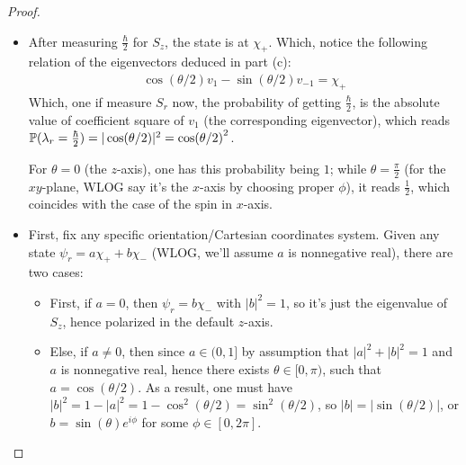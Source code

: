 \documentclass{article}
\begin{document}
\begin{proof}
\begin{itemize}
        Passing through $S_r$, we get the eigenvalues and eigenvectors as follow:
        \begin{align}
            &\lambda=\frac{\hbar}{2}\ \implies\ v_1 = \begin{pmatrix}
                \cos(\theta/2)\\\sin(\theta/2)e^{i\phi}
            \end{pmatrix} = \cos(\theta/2)\chi_+ + \sin(\theta/2)e^{i\phi}\chi_-\\
            &\lambda=\frac{\hbar}{2}\ \implies\ v_{-1} = \begin{pmatrix}
                -\sin(\theta/2)\\\cos(\theta/2)e^{i\phi}
            \end{pmatrix} = -\sin(\theta/2)\chi_+ + \cos(\theta/2)e^{i\phi}\chi_-
        \end{align}

        \hfil

        \item[(d)] After measuring $\frac{\hbar}{2}$ for $S_z$, the state is at $\chi_+$. Which, notice the following relation of the eigenvectors deduced in part (c):
        \begin{align}
            \cos(\theta/2)v_1 - \sin(\theta/2)v_{-1} = \chi_+
        \end{align}
        Which, one if measure $S_r$ now, the probability of getting $\frac{\hbar}{2}$, is the absolute value of coefficient square of $v_1$ (the corresponding eigenvector), which reads $\mathbb{P}(\lambda_r = \frac{\hbar}{2})=|\cos(\theta/2)|^2 = \cos(\theta/2)^2$.

        For $\theta=0$ (the $z$-axis), one has this probability being $1$; while $\theta=\frac{\pi}{2}$ (for the $xy$-plane, WLOG say it's the $x$-axis by choosing proper $\phi$), it reads $\frac{1}{2}$, which coincides with the case of the spin in $x$-axis.

        \hfil

        \item[(e)] First, fix any specific orientation/Cartesian coordinates system. Given any state $\psi_r = a\chi_++b\chi_-$ (WLOG, we'll assume $a$ is nonnegative real), there are two cases:
        \begin{itemize}
            \item First, if $a=0$, then $\psi_r = b\chi_-$ with $|b|^2=1$, so it's just the eigenvalue of $S_z$, hence polarized in the default $z$-axis.
            \item Else, if $a\neq 0$, then since $a\in(0,1]$ by assumption that $|a|^2+|b|^2=1$ and $a$ is nonnegative real, hence there exists $\theta\in [0,\pi)$, such that $a = \cos(\theta/2)$. As a result, one must have $|b|^2 = 1-|a|^2 = 1-\cos^2(\theta/2) = \sin^2(\theta/2)$, so $|b|=|\sin(\theta/2)|$, or $b = \sin(\theta)e^{i\phi}$ for some $\phi\in [0,2\pi]$.
            

\end{itemize}
\end{itemize}
\end{proof}
\end{document}
